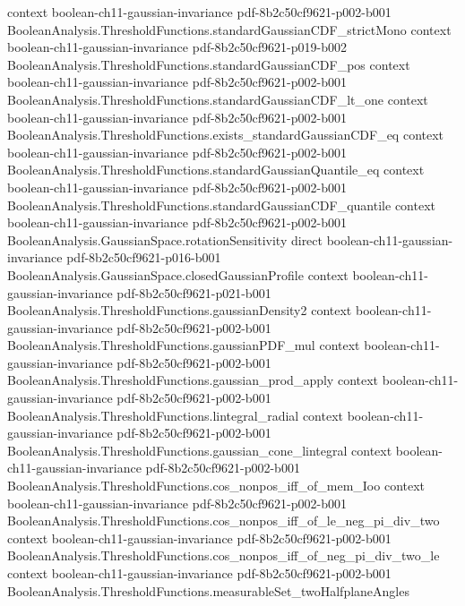 \begin{theorem}
  {context}
  {boolean-ch11-gaussian-invariance}
  {pdf-8b2c50cf9621-p002-b001}
\proofstep
  {BooleanAnalysis.ThresholdFunctions.standardGaussianCDF_strictMono}
  {context}
  {boolean-ch11-gaussian-invariance}
  {pdf-8b2c50cf9621-p019-b002}
\proofstep
  {BooleanAnalysis.ThresholdFunctions.standardGaussianCDF_pos}
  {context}
  {boolean-ch11-gaussian-invariance}
  {pdf-8b2c50cf9621-p002-b001}
\proofstep
  {BooleanAnalysis.ThresholdFunctions.standardGaussianCDF_lt_one}
  {context}
  {boolean-ch11-gaussian-invariance}
  {pdf-8b2c50cf9621-p002-b001}
\proofstep
  {BooleanAnalysis.ThresholdFunctions.exists_standardGaussianCDF_eq}
  {context}
  {boolean-ch11-gaussian-invariance}
  {pdf-8b2c50cf9621-p002-b001}
\proofstep
  {BooleanAnalysis.ThresholdFunctions.standardGaussianQuantile_eq}
  {context}
  {boolean-ch11-gaussian-invariance}
  {pdf-8b2c50cf9621-p002-b001}
\proofstep
  {BooleanAnalysis.ThresholdFunctions.standardGaussianCDF_quantile}
  {context}
  {boolean-ch11-gaussian-invariance}
  {pdf-8b2c50cf9621-p002-b001}
\proofstep
  {BooleanAnalysis.GaussianSpace.rotationSensitivity}
  {direct}
  {boolean-ch11-gaussian-invariance}
  {pdf-8b2c50cf9621-p016-b001}
\proofstep
  {BooleanAnalysis.GaussianSpace.closedGaussianProfile}
  {context}
  {boolean-ch11-gaussian-invariance}
  {pdf-8b2c50cf9621-p021-b001}
\proofstep
  {BooleanAnalysis.ThresholdFunctions.gaussianDensity2}
  {context}
  {boolean-ch11-gaussian-invariance}
  {pdf-8b2c50cf9621-p002-b001}
\proofstep
  {BooleanAnalysis.ThresholdFunctions.gaussianPDF_mul}
  {context}
  {boolean-ch11-gaussian-invariance}
  {pdf-8b2c50cf9621-p002-b001}
\proofstep
  {BooleanAnalysis.ThresholdFunctions.gaussian_prod_apply}
  {context}
  {boolean-ch11-gaussian-invariance}
  {pdf-8b2c50cf9621-p002-b001}
\proofstep
  {BooleanAnalysis.ThresholdFunctions.lintegral_radial}
  {context}
  {boolean-ch11-gaussian-invariance}
  {pdf-8b2c50cf9621-p002-b001}
\proofstep
  {BooleanAnalysis.ThresholdFunctions.gaussian_cone_lintegral}
  {context}
  {boolean-ch11-gaussian-invariance}
  {pdf-8b2c50cf9621-p002-b001}
\proofstep
  {BooleanAnalysis.ThresholdFunctions.cos_nonpos_iff_of_mem_Ioo}
  {context}
  {boolean-ch11-gaussian-invariance}
  {pdf-8b2c50cf9621-p002-b001}
\proofstep
  {BooleanAnalysis.ThresholdFunctions.cos_nonpos_iff_of_le_neg_pi_div_two}
  {context}
  {boolean-ch11-gaussian-invariance}
  {pdf-8b2c50cf9621-p002-b001}
\proofstep
  {BooleanAnalysis.ThresholdFunctions.cos_nonpos_iff_of_neg_pi_div_two_le}
  {context}
  {boolean-ch11-gaussian-invariance}
  {pdf-8b2c50cf9621-p002-b001}
\proofstep
  {BooleanAnalysis.ThresholdFunctions.measurableSet_twoHalfplaneAngles}

\end{theorem}
